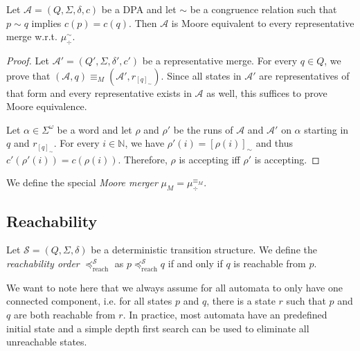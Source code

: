 \begin{lem}
\label{lem:general:congrel_prio_implies_moore}
	Let $\mathcal{A} = (Q, \Sigma, \delta, c)$ be a DPA and let $\sim$ be a congruence relation such that $p \sim q$ implies $c(p) = c(q)$. Then $\mathcal{A}$ is Moore equivalent to every representative merge w.r.t. $\mu_\div^\sim$.
\end{lem} 

\begin{proof} 
	Let $\mathcal{A}' = (Q', \Sigma, \delta', c')$ be a representative merge. For every $q \in Q$, we prove that $(\mathcal{A}, q) \equiv_M (\mathcal{A}', r_{[q]_\sim})$. Since all states in $\mathcal{A}'$ are representatives of that form and every representative exists in $\mathcal{A}$ as well, this suffices to prove Moore equivalence.
	
	Let $\alpha \in \Sigma^\omega$ be a word and let $\rho$ and $\rho'$ be the runs of $\mathcal{A}$ and $\mathcal{A}'$ on $\alpha$ starting in $q$ and $r_{[q]_\sim}$. For every $i \in \mathbb{N}$, we have $\rho'(i) = [\rho(i)]_\sim$ and thus $c'(\rho'(i)) = c(\rho(i))$. Therefore, $\rho$ is accepting iff $\rho'$ is accepting.
\end{proof}

\begin{defn}
	We define the special \emph{Moore merger} $\mu_M = \mu_\div^{\equiv_M}$.
\end{defn}

\vspace{5pt}





\subsection{Reachability}

\begin{defn}
	Let $\mathcal{S} = (Q, \Sigma, \delta)$ be a deterministic transition structure. We define the \emph{reachability order} $\preceq_\text{reach}^\mathcal{S}$ as $p \preceq_\text{reach}^\mathcal{S} q$ if and only if $q$ is reachable from $p$. 
\end{defn}

We want to note here that we always assume for all automata to only have one connected component, i.e. for all states $p$ and $q$, there is a state $r$ such that $p$ and $q$ are both reachable from $r$. In practice, most automata have an predefined initial state and a simple depth first search can be used to eliminate all unreachable states.

